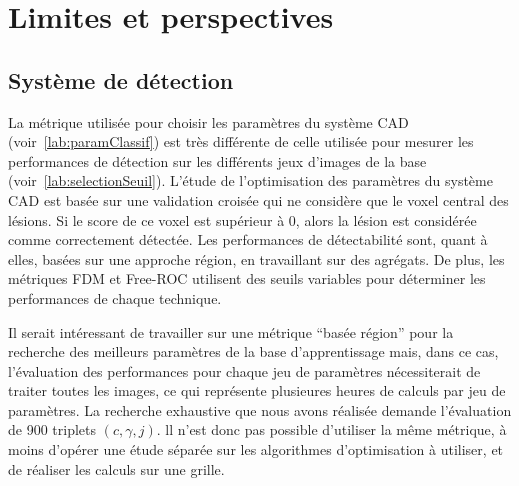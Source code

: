 % 
% 
% 

\section{Limites et perspectives}


\subsection{Système de détection}

La métrique utilisée pour choisir les paramètres du système CAD
(voir~\ref{lab:paramClassif}) est très différente de celle utilisée pour
mesurer les performances de détection sur les différents jeux d'images de la base
(voir~\ref{lab:selectionSeuil}). L'étude de l'optimisation des paramètres du
système CAD est basée sur une validation croisée qui ne considère que le
voxel central des lésions. Si le score de ce voxel est supérieur à 0,
alors la lésion est considérée comme correctement détectée. Les
performances de détectabilité sont, quant à elles, basées sur une approche
région, en travaillant sur des agrégats. De plus, les métriques FDM et
Free-ROC utilisent des seuils variables pour déterminer les performances de chaque
technique. 

Il serait intéressant de travailler sur une métrique ``basée région'' pour la
recherche des meilleurs paramètres de la base d'apprentissage mais, dans ce cas,
l'évaluation des performances pour chaque jeu de paramètres nécessiterait de traiter
toutes les images, ce qui représente plusieures heures de calculs par jeu de
paramètres. La recherche exhaustive que nous avons réalisée demande l'évaluation
de 900 triplets $(c, \gamma, j)$. ll n'est donc pas possible d'utiliser la même
métrique, à moins d'opérer une étude séparée sur les algorithmes d'optimisation à utiliser, et de
réaliser les calculs sur une grille. 

